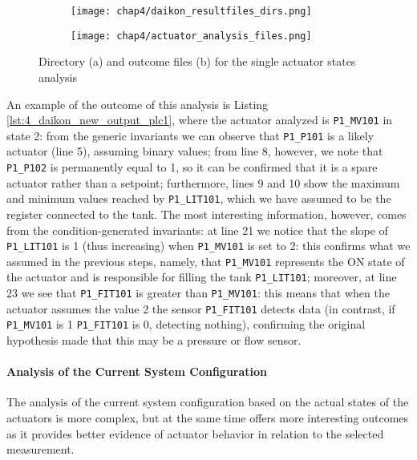 \begin{figure}[H]
	\centering
	\begin{subfigure}{0.48\textwidth}
		\texttt{[image: chap4/daikon\_resultfiles\_dirs.png]}
		\caption{}
		\label{subfig:4_daikon_results_dir}
	\end{subfigure}
	\hfill
	\begin{subfigure}{0.48\textwidth}
		\texttt{[image: chap4/actuator\_analysis\_files.png]}
		\caption{}
		\label{subfig:4_daikon_results_file}
	\end{subfigure}
	\caption{Directory (a) and outcome files (b) for the single actuator states analysis}
	\label{fig:4_daikon_simpleanalysis_dirfiles}
\end{figure}

An example of the outcome of this analysis is Listing \ref{lst:4_daikon_new_output_plc1}, where the actuator analyzed is \texttt{P1\_MV101} in state 2: from the generic invariants we can observe that \texttt{P1\_P101} is a likely actuator (line 5), assuming binary values; from line 8, however, we note that \texttt{P1\_P102} is permanently equal to 1, so it can be confirmed that it is a spare actuator rather than a setpoint; furthermore, lines 9 and 10 show the maximum and minimum values reached by \texttt{P1\_LIT101}, which we have assumed to be the register connected to the tank. The most interesting information, however, comes from the condition-generated invariants: at line 21 we notice that the slope of \texttt{P1\_LIT101} is 1 (thus increasing) when \texttt{P1\_MV101} is set to 2: this confirms what we assumed in the previous steps, namely, that \texttt{P1\_MV101} represents the ON state of the actuator and is responsible for filling the tank \texttt{P1\_LIT101}; moreover, at line 23 we see that \texttt{P1\_FIT101} is greater than \texttt{P1\_MV101}: this means that when the actuator assumes the value 2 the sensor \texttt{P1\_FIT101} detects data (in contrast, if \texttt{P1\_MV101} is 1 \texttt{P1\_FIT101} is 0, detecting nothing), confirming the original hypothesis made that this may be a pressure or flow sensor.

\paragraph{Analysis of the Current System Configuration}
The analysis of the current system configuration based on the actual states of the actuators is more complex, but at the same time offers more interesting outcomes as it provides better evidence of actuator behavior in relation to the selected measurement.

